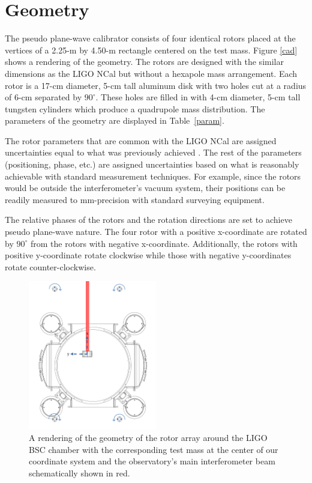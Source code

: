 \documentclass[superscriptaddress, twocolumn, prd]{revtex4-1}
\begin{document}
\section{Geometry}

The pseudo plane-wave calibrator consists of four identical rotors placed at the vertices of a 2.25-m by 4.50-m rectangle centered on the test mass. Figure \ref{cad} shows a rendering of the geometry. The rotors are designed with the similar dimensions as the LIGO NCal \cite{ncal} but without a hexapole mass arrangement. Each rotor is a 17-cm diameter, 5-cm tall aluminum disk with two holes cut at a radius of 6-cm separated by $90^\circ$. These holes are filled in with 4-cm diameter, 5-cm tall  tungsten cylinders which produce a quadrupole mass distribution. The parameters of the geometry are displayed in Table~\ref{param}.

The rotor parameters that are common with the LIGO NCal are assigned uncertainties equal to what was previously achieved \cite{ncal}. The rest of the parameters (positioning, phase, etc.) are assigned uncertainties based on what is reasonably achievable with standard measurement techniques. For example, since the rotors would be outside the interferometer's vacuum system, their positions can be readily measured to  mm-precision with standard surveying equipment. \cite{ncal}

The relative phases of the rotors and the rotation directions are set to achieve pseudo plane-wave nature. The four rotor with a positive x-coordinate are rotated by $90^\circ$ from the rotors with negative x-coordinate. Additionally, the rotors with positive y-coordinate rotate clockwise while those with negative y-coordinates rotate counter-clockwise. 

\begin{figure}[!h]
\centering \includegraphics[width=0.5\textwidth]{Super4BSCTopDownAxesSpinNew.pdf}
\caption{A rendering of the geometry of the rotor array around the LIGO BSC chamber with the corresponding test mass at the center of our coordinate system and the observatory's main interferometer beam schematically shown in red.}
\label{bsc} 
\end{figure}
\end{document}
